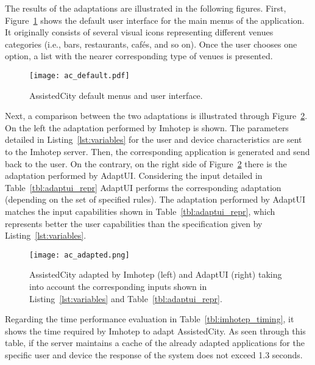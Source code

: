 The results of the adaptations are illustrated in the following figures. First,
Figure~\ref{fig:ac_default} shows the default user interface for the main menus 
of the application. It originally consists of several visual icons representing 
different venues categories (i.e., bars, restaurants, cafés, and so on). Once the 
user chooses one option, a list with the nearer corresponding type of venues
is presented.

\begin{figure}[H]
\centering
\texttt{[image: ac\_default.pdf]}
\caption{AssistedCity default menus and user interface.}
\label{fig:ac_default}
\end{figure}

Next, a comparison between the two adaptations is illustrated through 
Figure~\ref{fig:ac_adapted}. On the left the adaptation performed by Imhotep is 
shown. The parameters detailed in Listing~\ref{lst:variables} for the user and 
device characteristics are sent to the Imhotep server. Then, the corresponding
application is generated and send back to the user. On the contrary, on the 
right side of Figure~\ref{fig:ac_adapted} there is the adaptation performed by 
AdaptUI. Considering the input detailed in Table~\ref{tbl:adaptui_repr} AdaptUI 
performs the corresponding adaptation (depending on the set of specified rules).
The adaptation performed by AdaptUI matches the input capabilities shown in
Table~\ref{tbl:adaptui_repr}, which represents better the user capabilities
than the specification given by Listing~\ref{lst:variables}.

\begin{figure}[H]
\centering
\texttt{[image: ac\_adapted.png]}
\caption{AssistedCity adapted by Imhotep (left) and AdaptUI (right) taking 
into account the corresponding inputs shown in Listing~\ref{lst:variables} and 
Table~\ref{tbl:adaptui_repr}.}
\label{fig:ac_adapted}
\end{figure}



Regarding the time performance evaluation in Table~\ref{tbl:imhotep_timing}, it 
shows the time required by Imhotep to adapt AssistedCity. As seen through this 
table, if the server maintains a cache of the already adapted applications for 
the specific user and device the response of the system does not exceed 1.3
seconds. 

